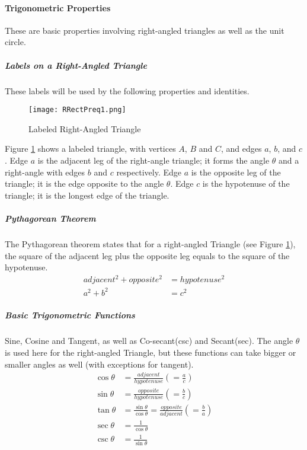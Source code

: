 \documentclass{article}
\begin{document}
        \paragraph{Trigonometric Properties} These are basic properties involving right-angled triangles as well as the unit circle.
            \subparagraph{Labels on a Right-Angled Triangle} These labels will be used by the following properties and identities.
            \begin{figure}[h!]
                \texttt{[image: RRectPreq1.png]}
                \caption{Labeled Right-Angled Triangle}
                \label{fig:tri1}
            \end{figure}\newline
            Figure \ref{fig:tri1} shows a labeled triangle, with vertices $A$, $B$ and $C$, and edges $a$, $b$, and $c$. Edge $a$ is the adjacent leg of the right-angle triangle; it forms the angle $\theta$ and a right-angle with edges $b$ and $c$ respectively. Edge $a$ is the opposite leg of the triangle; it is the edge opposite to the angle $\theta$. Edge $c$ is the hypotenuse of the triangle; it is the longest edge of the triangle.
            \subparagraph{Pythagorean Theorem}\label{PYTH:1} The Pythagorean theorem states that for a right-angled Triangle (see Figure \ref{fig:tri1}), the square of the adjacent leg plus the opposite leg equals to the square of the hypotenuse.
            \begin{align*}
                adjacent^2 + opposite^2 &= hypotenuse^2 \\
                a^2 + b^2 &= c^2
            \end{align*}
            \subparagraph{Basic Trigonometric Functions}\label{TRIG:1} Sine, Cosine and Tangent, as well as Co-secant(csc) and Secant(sec). The angle $\theta$ is used here for the right-angled Triangle, but these functions can take bigger or smaller angles as well (with exceptions for tangent).
            \begin{align*}
                \cos{\theta} &= \frac{adjacent}{hypotenuse} \left(= \frac{a}{c}\right) \\
                \sin{\theta} &= \frac{opposite}{hypotenuse} \left(= \frac{b}{c}\right) \\
                \tan{\theta} &= \frac{\sin{\theta}}{\cos{\theta}} = \frac{opposite}{adjacent} \left(= \frac{b}{a}\right) \\
                \sec{\theta} &= \frac{1}{\cos{\theta}} \\
                \csc{\theta} &= \frac{1}{\sin{\theta}} \\
            \end{align*}
\end{document}
